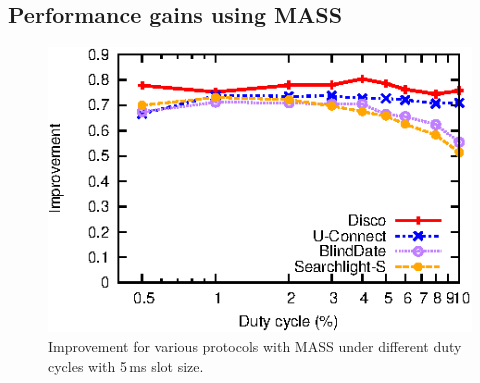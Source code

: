 \documentclass[twoside,twocolumn]{article}
\begin{document}
\subsection{Performance gains using MASS}

\begin{figure}[t]
   \centering
   \includegraphics{graphs/protocols_improvement/improve}
   \caption{Improvement for various protocols with MASS
      under different duty cycles with 5\,ms slot size.}
   \label{fig:improve}
\end{figure}
\end{document}
